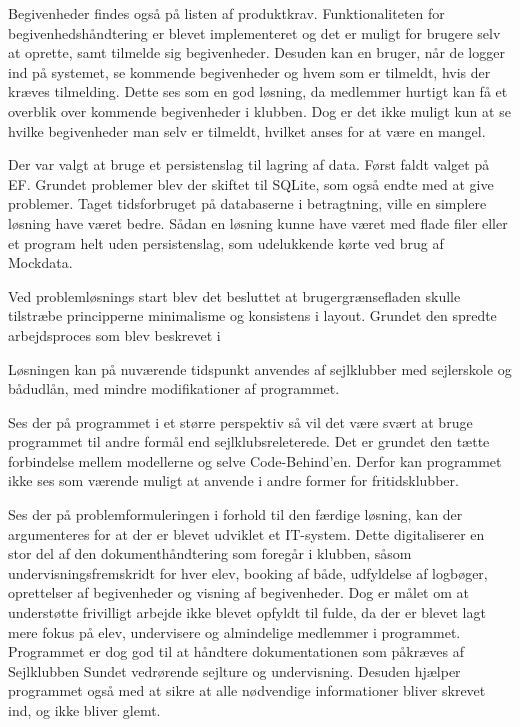 Begivenheder findes også på listen af produktkrav.
Funktionaliteten for begivenhedshåndtering er blevet implementeret og det er muligt for brugere selv at oprette, samt tilmelde sig begivenheder.
Desuden kan en bruger, når de logger ind på systemet, se kommende begivenheder og hvem som er tilmeldt, hvis der kræves tilmelding. 
Dette ses som en god løsning, da medlemmer hurtigt kan få et overblik over kommende begivenheder i klubben.
Dog er det ikke muligt kun at se hvilke begivenheder man selv er tilmeldt, hvilket anses for at være en mangel. 

Der var valgt at bruge et persistenslag til lagring af data. 
Først faldt valget på \acl{EF}. 
Grundet problemer blev der skiftet til SQLite, som også endte med at give problemer. 
Taget tidsforbruget på databaserne i betragtning, ville en simplere løsning have været bedre.
Sådan en løsning kunne have været med flade filer eller et program helt uden persistenslag, som udelukkende kørte ved brug af Mockdata.  

Ved problemløsnings start blev det besluttet at brugergrænsefladen skulle tilstræbe principperne minimalisme og konsistens i layout.
Grundet den spredte arbejdsproces som blev beskrevet i 

Løsningen kan på nuværende tidspunkt anvendes af sejlklubber med sejlerskole og bådudlån, med mindre modifikationer af programmet. 

Ses der på programmet i et større perspektiv så vil det være svært at bruge programmet til andre formål end sejlklubsreleterede. 
Det er grundet den tætte forbindelse mellem modellerne og selve Code-Behind'en. 
Derfor kan programmet ikke ses som værende muligt at anvende i andre former for fritidsklubber. 



Ses der på problemformuleringen i forhold til den færdige løsning, kan der argumenteres for at der er blevet udviklet et IT-system. 
Dette digitaliserer en stor del af den dokumenthåndtering som foregår i klubben, såsom undervisningsfremskridt for hver elev, booking af både, udfyldelse af logbøger, oprettelser af begivenheder og visning af begivenheder.
Dog er målet om at understøtte frivilligt arbejde ikke blevet opfyldt til fulde, da der er blevet lagt mere fokus på elev, undervisere og almindelige medlemmer i programmet. 
Programmet er dog god til at håndtere dokumentationen som påkræves af Sejlklubben Sundet vedrørende sejlture og undervisning.
Desuden hjælper programmet også med at sikre at alle nødvendige informationer bliver skrevet ind, og ikke bliver glemt.

